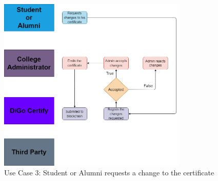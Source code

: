 \begin{figure}[H]
    \centering
    \includegraphics[width=0.8\textwidth]{../diagrams/certificate-update.drawio.png}
    \caption{Use Case 3: Student or Alumni requests a change to the certificate}
    \label{fig:use-case-3}
\end{figure}

